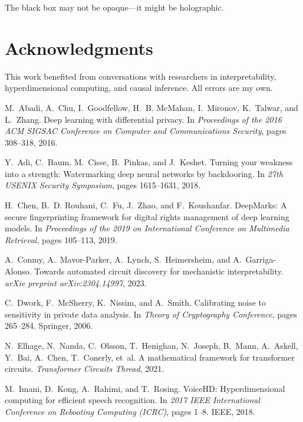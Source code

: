 \documentclass[11pt,a4paper]{article}
\begin{document}
The black box may not be opaque—it might be holographic.

\section*{Acknowledgments}

This work benefited from conversations with researchers in interpretability, hyperdimensional computing, and causal inference. All errors are my own.

\begin{thebibliography}{10}

M.~Abadi, A.~Chu, I.~Goodfellow, H.~B. McMahan, I.~Mironov, K.~Talwar, and L.~Zhang.
\newblock Deep learning with differential privacy.
\newblock In \textit{Proceedings of the 2016 ACM SIGSAC Conference on Computer and Communications Security}, pages 308--318, 2016.

Y.~Adi, C.~Baum, M.~Cisse, B.~Pinkas, and J.~Keshet.
\newblock Turning your weakness into a strength: Watermarking deep neural networks by backdooring.
\newblock In \textit{27th USENIX Security Symposium}, pages 1615--1631, 2018.

H.~Chen, B.~D. Rouhani, C.~Fu, J.~Zhao, and F.~Koushanfar.
\newblock DeepMarks: A secure fingerprinting framework for digital rights management of deep learning models.
\newblock In \textit{Proceedings of the 2019 on International Conference on Multimedia Retrieval}, pages 105--113, 2019.

A.~Conmy, A.~Mavor-Parker, A.~Lynch, S.~Heimersheim, and A.~Garriga-Alonso.
\newblock Towards automated circuit discovery for mechanistic interpretability.
\newblock \textit{arXiv preprint arXiv:2304.14997}, 2023.

C.~Dwork, F.~McSherry, K.~Nissim, and A.~Smith.
\newblock Calibrating noise to sensitivity in private data analysis.
\newblock In \textit{Theory of Cryptography Conference}, pages 265--284. Springer, 2006.

N.~Elhage, N.~Nanda, C.~Olsson, T.~Henighan, N.~Joseph, B.~Mann, A.~Askell, Y.~Bai, A.~Chen, T.~Conerly, et~al.
\newblock A mathematical framework for transformer circuits.
\newblock \textit{Transformer Circuits Thread}, 2021.

M.~Imani, D.~Kong, A.~Rahimi, and T.~Rosing.
\newblock VoiceHD: Hyperdimensional computing for efficient speech recognition.
\newblock In \textit{2017 IEEE International Conference on Rebooting Computing (ICRC)}, pages 1--8. IEEE, 2018.


\end{thebibliography}
\end{document}
